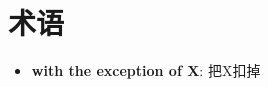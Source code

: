 \chapter{术语}

\begin{multicols}{3}
  \begin{itemize}
    \item \textbf{with the exception of X}: 把X扣掉
  \end{itemize}
\end{multicols}
